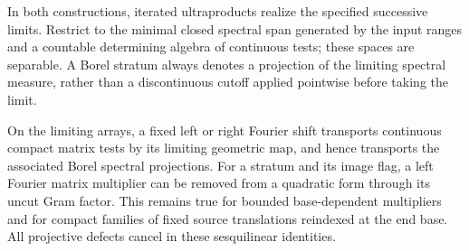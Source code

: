 In both constructions, iterated ultraproducts realize the specified
successive limits. Restrict to the minimal closed spectral span generated
by the input ranges and a countable determining algebra of continuous
tests; these spaces are separable. A Borel stratum always denotes a
projection of the limiting spectral measure, rather than a discontinuous
cutoff applied pointwise before taking the limit.

\begin{lemma}
\label{lem:links-gram-transport}
On the limiting arrays, a fixed left or right Fourier shift
transports continuous compact matrix tests by its limiting geometric
map, and hence transports the associated Borel spectral projections.
For a stratum and its image flag, a left Fourier matrix multiplier
can be removed from a quadratic form through its uncut Gram factor.
This remains true for bounded base-dependent multipliers and for
compact families of fixed source translations reindexed at the end
base. All projective defects cancel in these sesquilinear identities.
\end{lemma}

